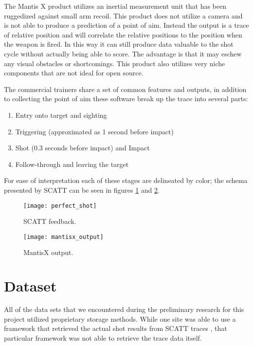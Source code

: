 \documentclass[conference]{IEEEtran}
\begin{document}
The Mantis X \cite{mantisx} product utilizes an inertial measurement unit that has been ruggedized against small arm recoil. 
This product does not utilize a camera and is not able to produce a prediction of a point of aim.
Instead the output is a trace of relative position and will correlate the relative positions to the position when the weapon is fired.
In this way it can still produce data valuable to the shot cycle without actually being able to score.
The advantage is that it may eschew any visual obstacles or shortcomings.
This product also utilizes very niche components that are not ideal for open source.

The commercial trainers share a set of common features and outputs,
in addition to collecting the point of aim these software break up the trace into several parts:
\begin{enumerate}
	\item Entry onto target and sighting
	\item Triggering (approximated as 1 second before impact)
	\item Shot (0.3 seconds before impact)  and Impact
	\item Follow-through and leaving the target
\end{enumerate}
For ease of interpretation each of these stages are delineated by color; the schema presented by SCATT can be seen in figures 
\ref{fig:SCATT_Example} and
\ref{fig:MantisX_Example}.

\begin{figure}[h]
	\centering
	\texttt{[image: perfect\_shot]}
	\caption{SCATT \cite{scatt} feedback.}
	\label{fig:SCATT_Example}
\end{figure}

\begin{figure}[h]
	\centering
	\texttt{[image: mantisx\_output]}
	\caption{MantisX \cite{mantisx} output.}
	\label{fig:MantisX_Example}
\end{figure}

\section{Dataset}

All of the data sets that we encountered during the preliminary research for this project utilized proprietary storage methods.
While one site was able to use a framework that retrieved the actual shot results from SCATT traces \cite{scatt-db}, that particular framework was not able to retrieve the trace data itself.
\end{document}
